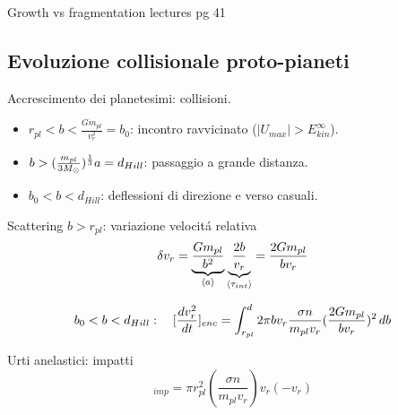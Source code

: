 \begin{frame}{Growth vs fragmentation}
lectures pg 41
\end{frame}



\subsection{Evoluzione collisionale proto-pianeti}

\begin{frame}{Accrescimento dei planetesimi: collisioni.}
\begin{itemize}
\item $r_{pl}<b<\frac{Gm_{pl}}{v_r^2}=b_0$: incontro ravvicinato ($|U_{max}|>E_{kin}^{\infty}$).
\item $b>(\frac{m_{pl}}{3\msun{}})\expy{\frac{1}{3}}a=d_{Hill}$: passaggio a grande distanza.
\item $b_0<b<d_{Hill}$: deflessioni di direzione e verso casuali.
\end{itemize}
\begin{block}{Scattering $b>r_{pl}$: variazione velocit\'a relativa}
\begin{equation*}
\delta v_r=\underbrace{\frac{Gm_{pl}}{b^2}}_{\exv{a}}\underbrace{\frac{2b}{v_r}}_{\exv{\tau_{int}}}=\frac{2Gm_{pl}}{bv_r}
\end{equation*}
\end{block}
\begin{equation*}
b_0<b<d_{Hill}:\quad [\TDy{t}{v_r^2}]_{enc}=\int_{r_{pl}}^d2\pi bv_r\frac{\sigma n}{m_{pl}v_r}(\frac{2Gm_{pl}}{bv_r})^2\,db
\end{equation*}
\begin{block}{Urti anelastici: impatti}
\begin{equation*}
[\TDy{t}{v_r^2}]_{imp}=\pi r_{pl}^2(\frac{\sigma n}{m_{pl}v_r})v_r(-v_r)
\end{equation*}
\end{block}
\end{frame}

